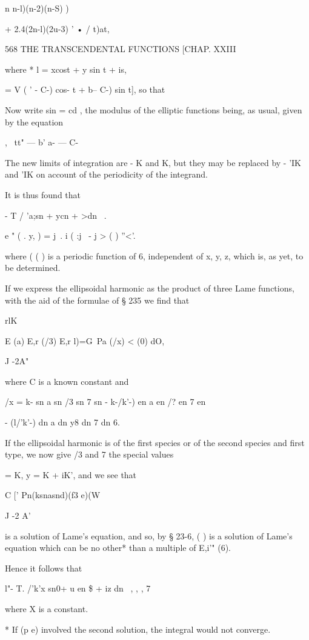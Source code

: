 {{{{{{{{n n-l)(n-2)(n-S) )

+ 2.4(2n-l)(2u-3) ' • / t)at,



568 THE TRANSCENDENTAL FUNCTIONS [CHAP. XXIII

where * l = xcost + y sin t + is,

  = V ( ' - C-) cos- t + b-- C-) sin t], so that

Now write sin = cd , the modulus of the elliptic functions being, as
usual, given by the equation

, \ tt" — b' a- — C-

The new limits of integration are - K and K, but they may be replaced
by - 'IK and 'IK on account of the periodicity of the integrand.

It is thus found that

 - T / 'a;sn + ycn + >dn \ .

e " ( . y, ) = j\ . i ( :j \ - j > ( ) ''<'.

where ( ( ) is a periodic function of 6, independent of x, y, z, which
is, as yet, to be determined.

If we express the ellipsoidal harmonic as the product of three Lame
functions, with the aid of the formulae of § 235 we find that



rlK

E (a) E,r (/3) E,r l)=G\ Pa (/x) < (0) dO,

J -2A"

where C is a known constant and

/x = k- sn a sn /3 sn 7 sn - k-/k'-) en a en /? en 7 en

- (l/'k'-) dn a dn y8 dn 7 dn 6.

If the ellipsoidal harmonic is of the first species or of the second
species and first type, we now give /3 and 7 the special values

  = K, y = K + iK', and we see that

C [' Pn(ksnasnd)(f3 e)(W

J -2 A'

is a solution of Lame's equation, and so, by § 23-6, ( ) is a solution
of Lame's equation which can be no other* than a multiple of E,i'"
(6).

Hence it follows that

l"- T. /'k'x sn0+ u en \$ + iz dn \ , , , 7

where X is a constant.

* If (p e) involved the second solution, the integral would not
converge.



}}}}}}}}
